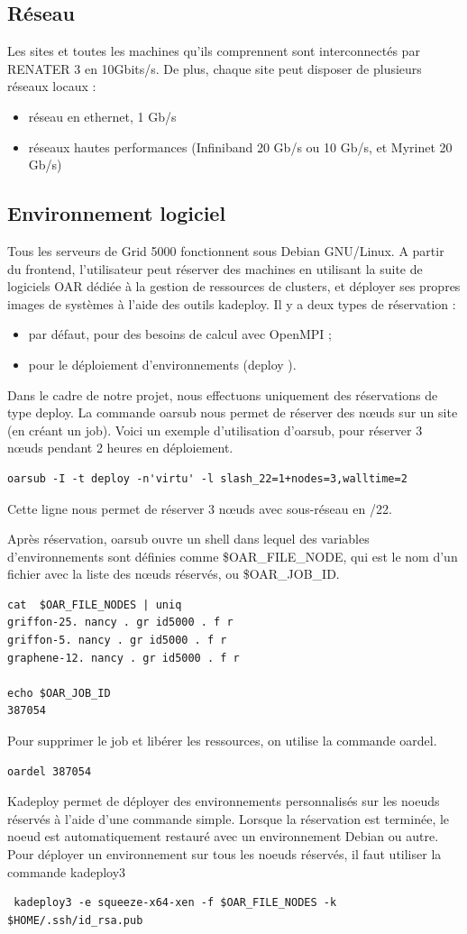   \subsection{Réseau}
Les sites et toutes les machines qu'ils comprennent sont interconnectés par RENATER 3 en 10Gbits/s. De
plus, chaque site peut disposer de plusieurs réseaux locaux :
\begin{itemize}
\item réseau en ethernet, 1 Gb/s
\item réseaux hautes performances (Infiniband 20 Gb/s ou 10 Gb/s, et Myrinet 20 Gb/s)
\end{itemize}

  \subsection{Environnement logiciel}
Tous les serveurs de Grid 5000 fonctionnent sous Debian GNU/Linux.
A partir du frontend, l'utilisateur peut réserver des machines en utilisant la suite de logiciels OAR dédiée à
la gestion de ressources de clusters, et déployer ses propres images de systèmes à l'aide des outils kadeploy.
Il y a deux types de réservation :
\begin{itemize}
\item par défaut, pour des besoins de calcul avec OpenMPI ;
\item pour le déploiement d'environnements (deploy ).
\end{itemize}
Dans le cadre de notre projet, nous effectuons uniquement des réservations de type deploy. La commande oarsub nous permet de réserver des nœuds sur un site (en créant un job). Voici un exemple d'utilisation d'oarsub, pour réserver 3 nœuds pendant 2 heures en déploiement.
\begin{lstlisting}
oarsub -I -t deploy -n'virtu' -l slash_22=1+nodes=3,walltime=2
\end{lstlisting}
Cette ligne nous permet de réserver 3 nœuds avec sous-réseau en /22.

Après réservation, oarsub ouvre un shell dans lequel des variables d'environnements sont définies comme \$OAR\_FILE\_NODE, qui est le nom d'un fichier avec la liste des nœuds réservés, ou \$OAR\_JOB\_ID.
\begin{lstlisting}
cat  $OAR_FILE_NODES | uniq
griffon-25. nancy . gr id5000 . f r
griffon-5. nancy . gr id5000 . f r
graphene-12. nancy . gr id5000 . f r

echo $OAR_JOB_ID
387054
\end{lstlisting}
Pour supprimer le job et libérer les ressources, on utilise la commande oardel.
\begin{lstlisting}
oardel 387054
\end{lstlisting}
Kadeploy permet de déployer des environnements personnalisés sur les noeuds réservés à l'aide d'une commande simple. Lorsque la réservation est terminée, le noeud est automatiquement restauré avec un environnement Debian ou autre.
Pour déployer un environnement sur tous les noeuds réservés, il faut utiliser la commande kadeploy3
\begin{lstlisting}
 kadeploy3 -e squeeze-x64-xen -f $OAR_FILE_NODES -k $HOME/.ssh/id_rsa.pub
\end{lstlisting}

